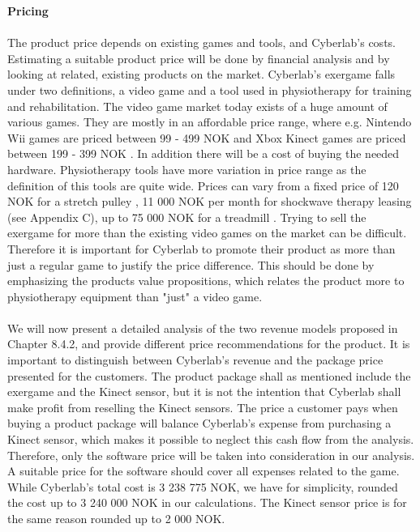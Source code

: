 \textbf{Pricing}\\ \\
The product price depends on existing games and tools, and Cyberlab's costs. Estimating a suitable product price will be done by financial analysis and by looking at related, existing products on the market. Cyberlab's exergame falls under two definitions, a video game and a tool used in physiotherapy for training and rehabilitation. The video game market today exists of a huge amount of various games. They are mostly in an affordable price range, where e.g. Nintendo Wii games are priced between 99 - 499 NOK \cite{elkjopwii} and Xbox Kinect games are priced between 199 - 399 NOK \cite{elkjopkinect}. In addition there will be a cost of buying the needed hardware. Physiotherapy tools have more variation in price range as the definition of this tools are quite wide. Prices can vary from a fixed price of 120 NOK for a stretch pulley \cite{stretchpulley}, 11 000 NOK per month for shockwave therapy leasing (see Appendix C), up to 75 000 NOK for a treadmill \cite{treadmill}. Trying to sell the exergame for more than the existing video games on the market can be difficult. Therefore it is important for Cyberlab to promote their product as more than just a regular game to justify the price difference. This should be done by emphasizing the products value propositions, which relates the product more to physiotherapy equipment than "just" a video game. \\ \\
We will now present a detailed analysis of the two revenue models proposed in Chapter 8.4.2, and provide different price recommendations for the product. It is important to distinguish between Cyberlab's revenue and the package price presented for the customers. The product package shall as mentioned include the exergame and the Kinect sensor, but it is not the intention that Cyberlab shall make profit from reselling the Kinect sensors. The price a customer pays when buying a product package will balance Cyberlab's expense from purchasing a Kinect sensor, which makes it possible to neglect this cash flow from the analysis. Therefore, only the software price will be taken into consideration in our analysis. A suitable price for the software should cover all expenses related to the game. While Cyberlab's total cost is 3 238 775 NOK, we have for simplicity,  rounded the cost up to 3 240 000 NOK in our calculations. The Kinect sensor price is for the same reason rounded up to 2 000 NOK. \\ \\ 
